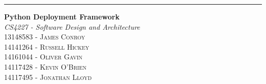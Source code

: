 \begin{titlepage}
	\raggedleft

	\rule{1pt}{\textheight}
	\hspace{0.05\textwidth}
	\parbox[b]{0.75\textwidth}{

		{\Huge\bfseries Python Deployment Framework}\\[2\baselineskip]
		{\large\textit{CS4227 - Software Design and Architecture}}\\[4\baselineskip]
		{\Large\textsc{13148583 - James Conroy}}\\[1\baselineskip]
		{\Large\textsc{14141264 - Russell Hickey}}\\[1\baselineskip]
		{\Large\textsc{14161044 - Oliver Gavin}}\\[1\baselineskip]
		{\Large\textsc{14117428 - Kevin O'Brien}}\\[1\baselineskip]
		{\Large\textsc{14117495 - Jonathan Lloyd}}\\[1\baselineskip]
		\vspace{0.25\textheight}
	}
\end{titlepage}
